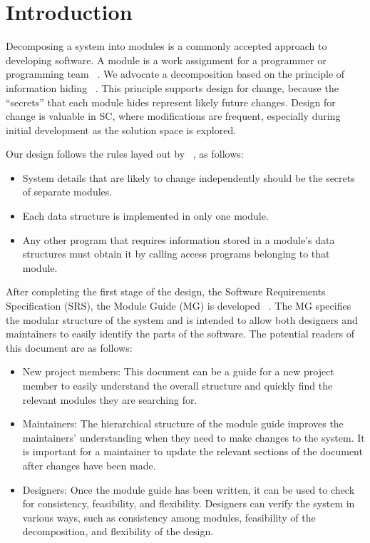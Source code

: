 \documentclass[12pt, titlepage]{article}
\begin{document}
\listoftables

\listoffigures

\newpage


\section{Introduction}

Decomposing a system into modules is a commonly accepted approach to developing
software.  A module is a work assignment for a programmer or programming
team ~\cite{Parnas1972a}.  We advocate a decomposition
based on the principle of information hiding ~\citep{Parnas1972a}.  This
principle supports design for change, because the ``secrets'' that each module
hides represent likely future changes.  Design for change is valuable in SC,
where modifications are frequent, especially during initial development as the
solution space is explored.  

Our design follows the rules layed out by ~\citet{ParnasEtAl1984}, as follows:
\begin{itemize}
\item System details that are likely to change independently should be the
  secrets of separate modules.
\item Each data structure is implemented in only one module.
\item Any other program that requires information stored in a module's data
  structures must obtain it by calling access programs belonging to that module.
\end{itemize}

After completing the first stage of the design, the Software Requirements
Specification (SRS), the Module Guide (MG) is developed ~\citep{ParnasEtAl1984}. The MG
specifies the modular structure of the system and is intended to allow both
designers and maintainers to easily identify the parts of the software.  The
potential readers of this document are as follows:

\begin{itemize}
\item New project members: This document can be a guide for a new project member
  to easily understand the overall structure and quickly find the
  relevant modules they are searching for.
\item Maintainers: The hierarchical structure of the module guide improves the
  maintainers' understanding when they need to make changes to the system. It is
  important for a maintainer to update the relevant sections of the document
  after changes have been made.
\item Designers: Once the module guide has been written, it can be used to
  check for consistency, feasibility, and flexibility. Designers can verify the
  system in various ways, such as consistency among modules, feasibility of the
  decomposition, and flexibility of the design.
\end{itemize}
\end{document}
